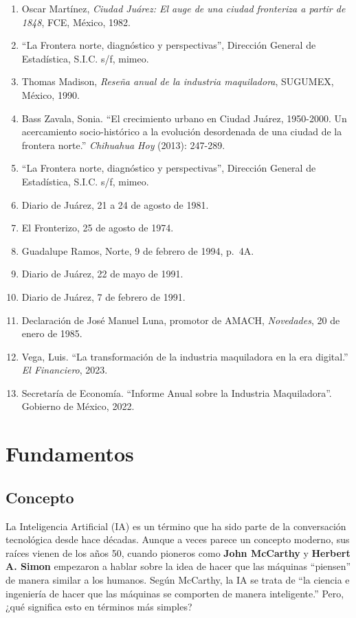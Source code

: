 \documentclass[
  10pt,
  letterpaper,
]{book}
\providecommand{\tightlist}{%
  \setlength{\itemsep}{0pt}\setlength{\parskip}{0pt}}\usepackage{longtable,booktabs,array}
\begin{document}
\begin{enumerate}
\def\labelenumi{\arabic{enumi}.}
\tightlist
\item
  Oscar Martínez, \emph{Ciudad Juárez: El auge de una ciudad fronteriza
  a partir de 1848}, FCE, México, 1982.
\item
  ``La Frontera norte, diagnóstico y perspectivas'', Dirección General
  de Estadística, S.I.C. s/f, mimeo.
\item
  Thomas Madison, \emph{Reseña anual de la industria maquiladora},
  SUGUMEX, México, 1990.
\item
  Bass Zavala, Sonia. ``El crecimiento urbano en Ciudad Juárez,
  1950-2000. Un acercamiento socio-histórico a la evolución desordenada
  de una ciudad de la frontera norte.'' \emph{Chihuahua Hoy} (2013):
  247-289.
\item
  ``La Frontera norte, diagnóstico y perspectivas'', Dirección General
  de Estadística, S.I.C. s/f, mimeo.
\item
  Diario de Juárez, 21 a 24 de agosto de 1981.
\item
  El Fronterizo, 25 de agosto de 1974.
\item
  Guadalupe Ramos, Norte, 9 de febrero de 1994, p.~4A.
\item
  Diario de Juárez, 22 de mayo de 1991.
\item
  Diario de Juárez, 7 de febrero de 1991.
\item
  Declaración de José Manuel Luna, promotor de AMACH, \emph{Novedades},
  20 de enero de 1985.
\item
  Vega, Luis. ``La transformación de la industria maquiladora en la era
  digital.'' \emph{El Financiero}, 2023.
\item
  Secretaría de Economía. ``Informe Anual sobre la Industria
  Maquiladora''. Gobierno de México, 2022.
\end{enumerate}


\chapter{Fundamentos}\label{fundamentos}

\section{Concepto}\label{concepto}

La Inteligencia Artificial (IA) es un término que ha sido parte de la
conversación tecnológica desde hace décadas. Aunque a veces parece un
concepto moderno, sus raíces vienen de los años 50, cuando pioneros como
\textbf{John McCarthy} y \textbf{Herbert A. Simon} empezaron a hablar
sobre la idea de hacer que las máquinas ``piensen'' de manera similar a
los humanos. Según McCarthy, la IA se trata de ``la ciencia e ingeniería
de hacer que las máquinas se comporten de manera inteligente.'' Pero,
¿qué significa esto en términos más simples?
\end{document}
